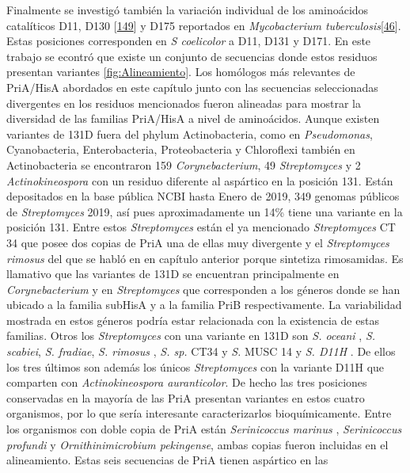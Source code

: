 \documentclass[12pt,twoside]{reedthesis}
\begin{document}
  Finalmente se investigó también la variación individual de los
  aminoácidos catalíticos D11, D130
  {[}\protect\hyperlink{ref-due_bisubstrate_2011}{149}{]} y D175
  reportados en \emph{Mycobacterium
  tuberculosis}{[}\protect\hyperlink{ref-verduzco-castro_co-occurrence_2016}{46}{]}.
  Estas posiciones corresponden en \emph{S coelicolor} a D11, D131 y D171.
  En este trabajo se econtró que existe un conjunto de secuencias donde
  estos residuos presentan variantes \autoref{fig:Alineamiento}. Los
  homólogos más relevantes de PriA/HisA abordados en este capítulo junto
  con las secuencias seleccionadas divergentes en los residuos mencionados
  fueron alineadas para mostrar la diversidad de las familias PriA/HisA a
  nivel de aminoácidos. Aunque existen variantes de 131D fuera del phylum
  Actinobacteria, como en \emph{Pseudomonas}, Cyanobacteria,
  Enterobacteria, Proteobacteria y Chloroflexi también en Actinobacteria
  se encontraron 159 \emph{Corynebacterium}, 49 \emph{Streptomyces} y 2
  \emph{Actinokineospora} con un residuo diferente al aspártico en la
  posición 131. Están depositados en la base pública NCBI hasta Enero de
  2019, 349 genomas públicos de \emph{Streptomyces} 2019, así pues
  aproximadamente un 14\% tiene una variante en la posición 131. Entre
  estos \emph{Streptomyces} están el ya mencionado \emph{Streptomyces } CT
  34 que posee dos copias de PriA una de ellas muy divergente y el
  \emph{Streptomyces rimosus} del que se habló en en capítulo anterior
  porque sintetiza rimosamidas. Es llamativo que las variantes de 131D se
  encuentran principalmente en \emph{Corynebacterium} y en
  \emph{Streptomyces} que corresponden a los géneros donde se han ubicado
  a la familia subHisA y a la familia PriB respectivamente. La
  variabilidad mostrada en estos géneros podría estar relacionada con la
  existencia de estas familias. Otros los \emph{Streptomyces} con una
  variante en 131D son \emph{S. oceani} , \emph{S. scabiei}, \emph{S.
  fradiae}, \emph{S. rimosus} , \emph{S. sp.} CT34 y \emph{S. } MUSC 14 y
  \emph{S. D11H} . De ellos los tres últimos son además los únicos
  \emph{Streptomyces} con la variante D11H que comparten con
  \emph{Actinokineospora auranticolor}. De hecho las tres posiciones
  conservadas en la mayoría de las PriA presentan variantes en estos
  cuatro organismos, por lo que sería interesante caracterizarlos
  bioquímicamente. Entre los organismos con doble copia de PriA están
  \emph{Serinicoccus marinus} , \emph{Serinicoccus profundi} y
  \emph{Ornithinimicrobium pekingense}, ambas copias fueron incluidas en
  el alineamiento. Estas seis secuencias de PriA tienen aspártico en las
\end{document}

